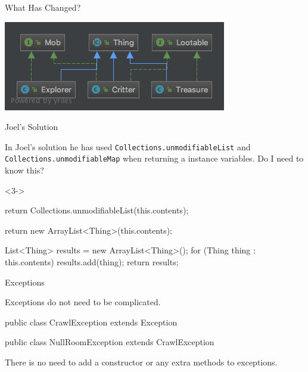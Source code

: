 \documentclass[12]{beamer}
\begin{document}
\begin{frame}[t]{What Has Changed?} \vspace{4pt}
\begin{center}
\includegraphics[scale=0.45]{resources/old_classes}\\[20pt]
\end{center}
\end{frame}

\begin{frame}[t, fragile]{Joel's Solution} \vspace{4pt}

In Joel's solution he has used \texttt{Collections.unmodifiableList} and \texttt{Collections.unmodifiableMap} when returning a instance variables. Do I need to know this?


\begin{onlyenv}<3->
\begin{java}
return Collections.unmodifiableList(this.contents);

return new ArrayList<Thing>(this.contents);

List<Thing> results = new ArrayList<Thing>();
for (Thing thing : this.contents) {
	results.add(thing);
}
return results;
\end{java}
\end{onlyenv}

\end{frame}

\begin{frame}[t, fragile]{Exceptions} \vspace{4pt}

Exceptions do not need to be complicated.

\begin{java}
public class CrawlException extends Exception {}

public class NullRoomException extends CrawlException {}
\end{java}

There is no need to add a constructor or any extra methods to exceptions.

\end{frame}
\end{document}
